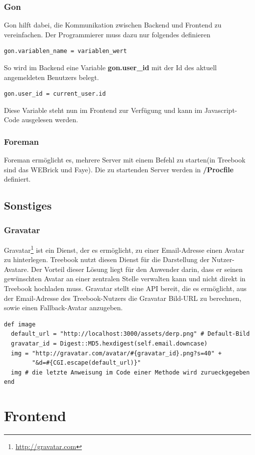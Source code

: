 \documentclass[10pt,a4paper]{book}
\begin{document}
\subsection{Gon}
Gon hilft dabei, die Kommunikation zwischen Backend und Frontend zu vereinfachen. Der Programmierer muss dazu nur folgendes definieren
\begin{lstlisting}
gon.variablen_name = variablen_wert
\end{lstlisting}
So wird im Backend eine Variable \textbf{gon.user\_id} mit der Id des aktuell angemeldeten Benutzers belegt.
\begin{lstlisting}
gon.user_id = current_user.id
\end{lstlisting}
Diese Variable steht nun im Frontend zur Verfügung und kann im Javascript-Code ausgelesen werden.
\subsection{Foreman}
Foreman ermöglicht es, mehrere Server mit einem Befehl zu starten(in Treebook sind das WEBrick und Faye). Die zu startenden Server werden in \textbf{/Procfile} definiert.
\section{Sonstiges}
\subsection{Gravatar}
Gravatar\footnote{\href{http://gravatar.com}{http://gravatar.com}} ist ein Dienst, der es ermöglicht, zu einer Email-Adresse einen Avatar zu hinterlegen. Treebook nutzt diesen Dienst für die Darstellung der Nutzer-Avatare. Der Vorteil dieser Lösung liegt für den Anwender darin, dass er seinen gewünschten Avatar an einer zentralen Stelle verwalten kann und nicht direkt in Treebook hochladen muss. Gravatar stellt eine API bereit, die es ermöglicht, aus der Email-Adresse des Treebook-Nutzers die Gravatar Bild-URL zu berechnen, sowie einen Fallback-Avatar anzugeben.
\begin{lstlisting}
def image
  default_url = "http://localhost:3000/assets/derp.png" # Default-Bild
  gravatar_id = Digest::MD5.hexdigest(self.email.downcase)
  img = "http://gravatar.com/avatar/#{gravatar_id}.png?s=40" +
        "&d=#{CGI.escape(default_url)}"
  img # die letzte Anweisung im Code einer Methode wird zurueckgegeben
end
\end{lstlisting}
\chapter{Frontend}
\end{document}
